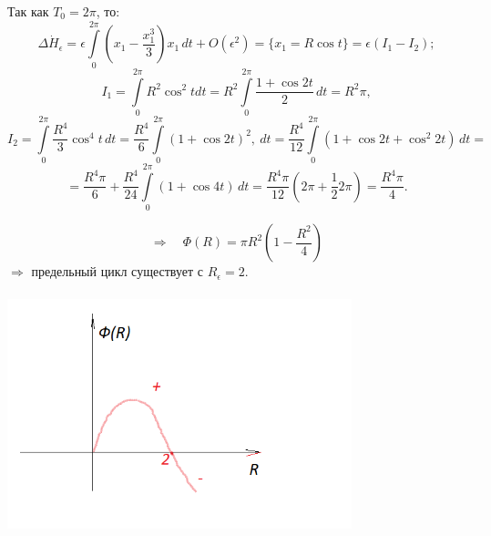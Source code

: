  	Так как \(T_0 = 2\pi\), то:
 	\[
 	\Delta \dot H_{\epsilon} = \epsilon \int \limits_0^{2\pi} \left(x_1- \dfrac{x_1^3}{3}\right)x_1 \, dt +O(\epsilon^2) = \{  x_1 = R \cos t\} = \epsilon (I_1-I_2);
 	\]
 	\[
 	I_1 = \int \limits_0^{2\pi}  R^2 \cos^2 t dt = R^2\int \limits_0^{2\pi} \dfrac{1+\cos 2t}{2} \, dt = R^2 \pi,
 	\]
 	\[
 	I_2 = \int \limits_0^{2\pi}  \dfrac{R^4}{3} \cos^4 t \,dt = \dfrac{R^4}{6} \int \limits_0^{2\pi} (1 + \cos 2t)^2 ,\ dt = \dfrac{R^4}{12} \int \limits_0^{2\pi}(1  + \cos 2t + \cos ^2 2t) \, dt=
 	\]
 	\[
 	=\dfrac{R^4\pi}{6} + \dfrac{R^4}{24} \int \limits_0^{2\pi}(1 + \cos 4t) \,dt = \dfrac{R^4\pi}{12}(2\pi + \dfrac{1}{2} 2\pi) = \dfrac{R^4 \pi}{4}.
 	\]
 	
 	\[
 	\Rightarrow \quad \Phi(R) = \pi R^2\left(1-\dfrac{R^2}{4} \right)
 	\]
 	\(\Rightarrow\) предельный цикл существует с \(R_{\epsilon} = 2\). 
 	\begin{center}
 		\includegraphics[width=10cm, height=7cm]{ch10/6}
 	\end{center}
 	
